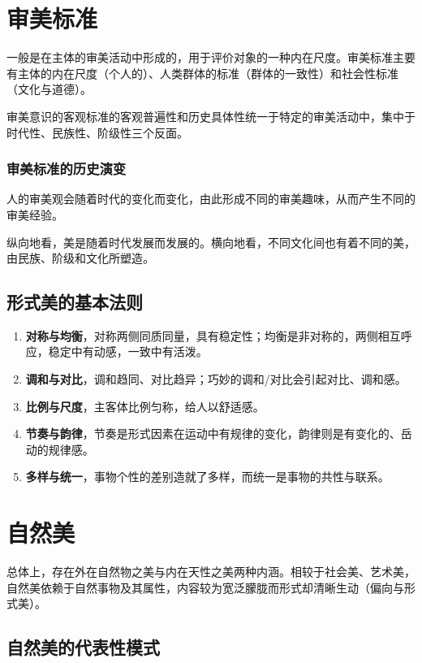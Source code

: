 \documentclass{NoteThesis/note-thesis}
\begin{document}
\section{审美标准}

一般是在主体的审美活动中形成的，用于评价对象的一种内在尺度。审美标准主要有主体的内在尺度（个人的）、人类群体的标准（群体的一致性）和社会性标准（文化与道德）。

审美意识的客观标准的客观普遍性和历史具体性统一于特定的审美活动中，集中于时代性、民族性、阶级性三个反面。

\subsubsection*{审美标准的历史演变}

人的审美观会随着时代的变化而变化，由此形成不同的审美趣味，从而产生不同的审美经验。

纵向地看，美是随着时代发展而发展的。横向地看，不同文化间也有着不同的美，由民族、阶级和文化所塑造。

\subsection{\texorpdfstring{\mbox{}}{} 形式美的基本法则}

\begin{enumerate}
    \item \textbf{对称与均衡}，对称两侧同质同量，具有稳定性；均衡是非对称的，两侧相互呼应，稳定中有动感，一致中有活泼。
    \item \textbf{调和与对比}，调和趋同、对比趋异；巧妙的调和/对比会引起对比、调和感。
    \item \textbf{比例与尺度}，主客体比例匀称，给人以舒适感。
    \item \textbf{节奏与韵律}，节奏是形式因素在运动中有规律的变化，韵律则是有变化的、岳动的规律感。
    \item \textbf{多样与统一}，事物个性的差别造就了多样，而统一是事物的共性与联系。
\end{enumerate}

\section{自然美}

总体上，存在外在自然物之美与内在天性之美两种内涵。相较于社会美、艺术美，自然美依赖于自然事物及其属性，内容较为宽泛朦胧而形式却清晰生动（偏向与形式美）。

\subsection{\texorpdfstring{\mbox{}}{} 自然美的代表性模式}
\end{document}
